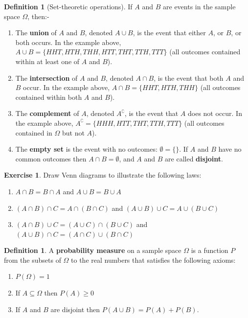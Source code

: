 \documentclass[a4paper,leqno]{article}
\numberwithin{equation}{section}
\theoremstyle{definition}
\newtheorem{defn}[equation]{Definition}
\newtheorem{exercise}[equation]{Exercise}
\theoremstyle{remark}
\newcommand{\df}{\textbf}
\newcommand{\union}{\cup}
\newcommand{\inter}{\cap}
\begin{document}
\begin{defn}[Set-theoretic operations]
  If $ A $ and $ B $ are events in the sample space $ \Omega $, then:-
  \begin{enumerate}
    \item The \df{union} of $ A $ and $ B $, denoted $ A \union B $, is the event that either $ A $, or $ B $, or both occurs. In the
          example above, $ A \union B = \{HHT, HTH, THH, HTT, THT, TTH, TTT\} $ (all outcomes contained within at least one of $ A $ and $ B $).
    \item The \df{intersection} of $ A $ and $ B $, denoted $ A \inter B $, is the event that both $ A $ and $ B $ occur. In the example
          above, $ A \inter B = \{HHT, HTH, THH\} $ (all outcomes contained within both $ A $ and $ B $).
    \item The \df{complement} of $ A $, denoted $ A^\complement $, is the event that $ A $ does not occur. In the example above,
          $ A^\complement = \{HHH, HTT, THT, TTH, TTT\} $ (all outcomes contained in $ \Omega $ but not $ A $).
    \item The \df{empty set} is the event with no outcomes: $ \emptyset = \{\} $. If $ A $ and $ B $ have no common outcomes
          then $ A \inter B = \emptyset $, and $ A $ and $ B $ are called \df{disjoint}.
  \end{enumerate}
\end{defn}

\begin{exercise}
  Draw Venn diagrams to illustrate the following laws:
  \begin{enumerate}
    \item $ A \inter B = B \inter A $ and $ A \union B = B \union A $
    \item $ (A \inter B) \inter C = A \inter (B \inter C) $ and $ (A \union B) \union C = A \union (B \union C) $
    \item $ (A \inter B) \union C = (A \union C) \inter (B \union C) $ and $ (A \union B) \inter C = (A \inter C) \union (B \inter C) $
  \end{enumerate}
\end{exercise}

\begin{defn}\label{df:probmeasure}
  A \df{probability measure} on a sample space $ \Omega $ is a function $ P $ from the subsets of $ \Omega $ to the real numbers
  that satisfies the following axioms:
  \begin{enumerate}
    \item $ P(\Omega) = 1 $
    \item If $ A \subseteq \Omega $ then $ P(A) \geq 0 $
    \item If $ A $ and $ B $ are disjoint then $ P(A \union B) = P(A) + P(B) $.
  \end{enumerate}
\end{defn}
\end{document}
